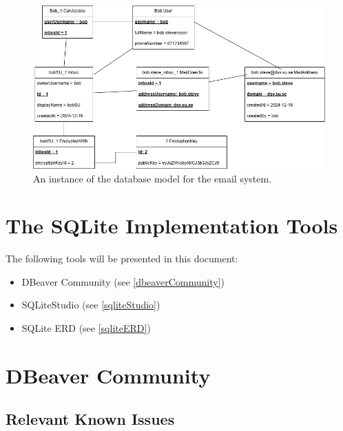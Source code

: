 \documentclass[a4paper,11pt,oneside]{article}
\begin{document}
\begin{sloppypar}
\begin{figure}[htb]
    \centering
    \includegraphics[width=1\textwidth]{model/instance.png}
    \caption{An instance of the database model for the email system.}
    \label{fig:instanceDatabaseModel}
\end{figure}

\section{The SQLite Implementation Tools}
\label{sqliteImplementationTools}
The following tools will be presented in this document:
\begin{itemize}
    \item DBeaver Community (see \autoref{dbeaverCommunity})
    \item SQLiteStudio (see \autoref{sqliteStudio})
    \item SQLite ERD (see \autoref{sqliteERD})
\end{itemize}

\section{DBeaver Community}
\label{dbeaverCommunity}

\subsection{Relevant Known Issues}
\label{dbeaverKnownIssues}


\end{sloppypar}
\end{document}
